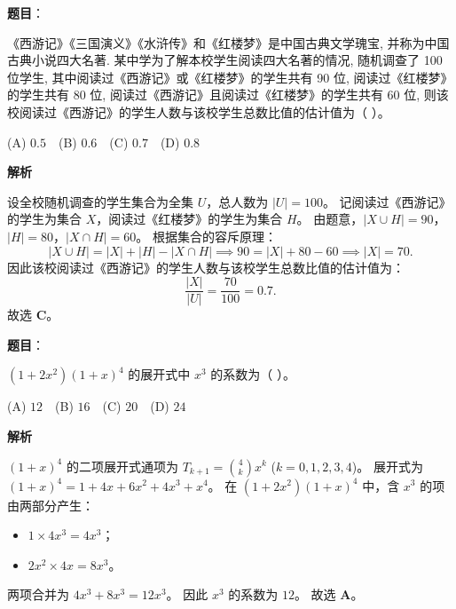 \begin{answer}

\textbf{题目}：

《西游记》《三国演义》《水浒传》和《红楼梦》是中国古典文学瑰宝, 并称为中国古典小说四大名著. 某中学为了解本校学生阅读四大名著的情况, 随机调查了 100 位学生, 其中阅读过《西游记》或《红楼梦》的学生共有 90 位, 阅读过《红楼梦》的学生共有 80 位, 阅读过《西游记》且阅读过《红楼梦》的学生共有 60 位, 则该校阅读过《西游记》的学生人数与该校学生总数比值的估计值为（ ）。

(A) $0.5$　(B) $0.6$　(C) $0.7$　(D) $0.8$

\textbf{解析}

设全校随机调查的学生集合为全集 $U$，总人数为 $|U| = 100$。
记阅读过《西游记》的学生为集合 $X$，阅读过《红楼梦》的学生为集合 $H$。
由题意，$|X \cup H| = 90$，$|H| = 80$，$|X \cap H| = 60$。
根据集合的容斥原理：
\nopagebreak[4]
\[|X \cup H| = |X| + |H| - |X \cap H| \implies 90 = |X| + 80 - 60 \implies |X| = 70.\]
因此该校阅读过《西游记》的学生人数与该校学生总数比值的估计值为：
\nopagebreak[4]
\[\frac{|X|}{|U|} = \frac{70}{100} = 0.7.\]
故选 \textbf{C}。


\end{answer}
\begin{answer}

\textbf{题目}：

$(1 + 2x^2)(1 + x)^4$ 的展开式中 $x^3$ 的系数为（ ）。

(A) $12$　(B) $16$　(C) $20$　(D) $24$

\textbf{解析}

$(1 + x)^4$ 的二项展开式通项为 $T_{k+1} = \binom{4}{k} x^k$ ($k = 0, 1, 2, 3, 4$)。
展开式为 $(1 + x)^4 = 1 + 4x + 6x^2 + 4x^3 + x^4$。
在 $(1 + 2x^2)(1 + x)^4$ 中，含 $x^3$ 的项由两部分产生：
\begin{itemize}
\item $1 \times 4x^3 = 4x^3$；
\item $2x^2 \times 4x = 8x^3$。
\end{itemize}
两项合并为 $4x^3 + 8x^3 = 12x^3$。
因此 $x^3$ 的系数为 $12$。
故选 \textbf{A}。


\end{answer}

